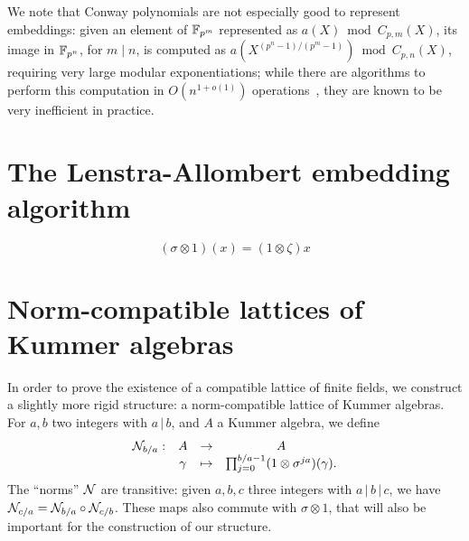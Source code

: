 \documentclass{sig-alternate}
\begin{document}
We note that Conway polynomials are not especially good to represent
embeddings: given an element of $\mathbb{F}_{p^m}$ represented as
$a(X) \bmod C_{p,m}(X)$, its image in $\mathbb{F}_{p^n}$, for $m\mid n$, is
computed as $a(X^{(p^n-1)/(p^m-1)})\bmod C_{p,n}(X)$, requiring very
large modular exponentiations; while there are algorithms to perform
this computation in $O(n^{1+o(1)})$ operations~\cite{KeUm11}, they are
known to be very inefficient in practice. %


\section{The Lenstra-Allombert embedding algorithm}
\label{sec:lenstra}

\cite{LenstraJr91}\cite{Allombert02}\cite{brieulle2018computing}

\begin{equation}
  \tag{H90}
 (\sigma\otimes1)(x) = (1\otimes\zeta)x
  \label{h90}
\end{equation}

\section{Norm-compatible lattices of Kummer algebras}
\label{sec:lattices}

In order to prove the existence of a compatible lattice of finite fields,
we construct a slightly more rigid structure: a norm-compatible lattice of
Kummer algebras. For $a, b$ two integers with $a\,|\,b$, and $A$ a Kummer
algebra, we define
\[
\begin{array}{cccc}
  \mathcal{N}_{b/a}: & A & \to & A \\
  & \gamma & \mapsto & \prod_{j=0}^{b/a-1} (1 \otimes
  \sigma^{ja})(\gamma).
\end{array}
\]
The ``norms'' $\mathcal{N}$ are transitive: given $a, b, c$ three integers with
$a\,|\,b\,|\,c$, we have $\mathcal{N}_{c/a} = \mathcal{N}_{b/a}\circ\mathcal{N}_{c/b}$. These maps also
commute with $\sigma\otimes1$, that will also be important for the construction
of our structure.
\end{document}
